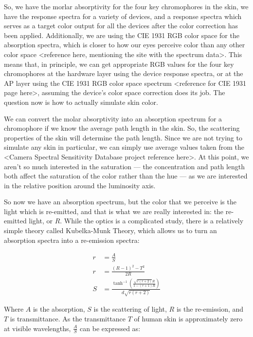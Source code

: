 So, we have the morlar absorptivity for the four key chromophores in the skin, we have the response spectra for a variety of devices, and a response spectra which serves as a target color output for all the devices after the color correction has been applied. Additionally, we are using the CIE 1931 RGB color space for the absorption spectra, which is closer to how our eyes perceive color than any other color space <reference here, mentioning the site with the spectrum data>. This means that, in principle, we can get appropriate RGB values for the four key chromophores at the hardware layer using the device response spectra, or at the AP layer using the CIE 1931 RGB color space spectrum <reference for CIE 1931 page here>, assuming the device's color space correction does its job. The question now is how to actually simulate skin color.

We can convert the molar absorptivity into an absorption spectrum for a chromophore if we know the average path length in the skin. So, the scattering properties of the skin will determine the path length. Since we are not trying to simulate any skin in particular, we can simply use average values taken from the <Camera Spectral Sensitivity Database project reference here>. At this point, we aren't so much interested in the saturation --- the concentration and path length both affect the saturation of the color rather than the hue --- as we are interested in the relative position around the luminosity axis.

So now we have an absorption spectrum, but the color that we perceive is the light which is re-emitted, and that is what we are really interested in: the re-emitted light, or $R$. While the optics is a complicated study, there is a relatively simple theory called Kubelka-Munk Theory, which allows us to turn an absorption spectra into a re-emission spectra:

\begin{align}\label{eq:KubelkaMunk}
r &=\frac{A}{S} \\
r & =\frac{(R-1)^2-T^2}{2 R} \\
S & =\frac{\tanh ^{-1}\left(\frac{\sqrt{r (r+2)} R}{1-(r+1) R}\right)}{d \sqrt{r (r+2)}}
\end{align}

Where $A$ is the absorption, $S$ is the scattering of light, $R$ is the re-emission, and $T$ is transmittance. As the transmittance $T$ of human skin is approximately zero at visible wavelengths, $\frac{A}{S}$ can be expressed as:

